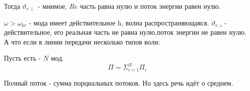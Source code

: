 Тогда $\vartheta_{v \perp}$  - мнимое, $Re$ часть равна нулю и поток энергии равен нулю.

$\omega > \omega_{kr}$ - мода имеет действительное h, волна распространяющаяся.
 $\vartheta_{v \perp}$- действительное, его реальная часть не равна нулю,поток энергии не равен нулю.
А что если в линии передачи несколько типов волн:

Пусть есть - $N$ мод.
\begin{equation}
	\Pi = \Sigma^{N}_{i = 1} \Pi_i
\end{equation}

Полный поток - сумма порциальных потоков.
Но здесь речь идёт о среднем.
